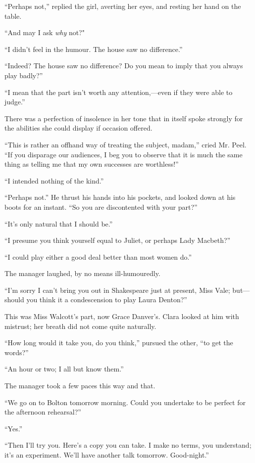 ``Perhaps not,'' replied the girl, averting her eyes, and resting her
hand on the table.

``And may I ask \emph{why} not?"

``I didn't feel in the humour. The house saw no difference.''

``Indeed? The house saw no difference? Do you mean to imply that you
always play badly?''

``I mean that the part isn't worth any attention,---even if they were
able to judge.''

{\protect\hypertarget{207}{}{}}There was a perfection of insolence in
her tone that in itself spoke strongly for the abilities she could
display if occasion offered.

``This is rather an offhand way of treating the subject, madam,'' cried
Mr. Peel. ``If you disparage our audiences, I beg you to observe that it
is much the same thing as telling me that my own successes are
worthless!''

``I intended nothing of the kind.''

``Perhaps not.'' He thrust his hands into his pockets, and looked down
at his boots for an instant. ``So you are discontented with your part?''

``It's only natural that I should be.''

``I presume you think yourself equal to Juliet, or perhaps Lady
Macbeth?''

``I could play either a good deal better than most women do.''

The manager laughed, by no means ill-humouredly.

``I'm sorry I can't bring you out in Shakespeare just at present, Miss
Vale; but---should you think it a condescension to play Laura Denton?''

{\protect\hypertarget{208}{}{}}This was Miss Walcott's part, now Grace
Danver's. Clara looked at him with mistrust; her breath did not come
quite naturally.

``How long would it take you, do you think,'' pursued the other, ``to
get the words?''

``An hour or two; I all but know them.''

The manager took a few paces this way and that.

``We go on to Bolton tomorrow morning. Could you undertake to be perfect
for the afternoon rehearsal?''

``Yes.''

``Then I'll try you. Here's a copy you can take. I make no terms, you
understand; it's an experiment. We'll have another talk tomorrow.
Good-night.''

